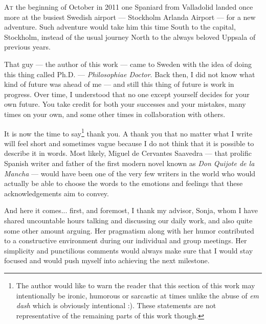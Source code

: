 

\lettrine{\textcolor[gray]{.25}{A}}{t} the beginning of October in 2011 one Spaniard 
from Valladolid landed once more at the busiest Swedish airport --- Stockholm Arlanda 
Airport --- for a new adventure. Such adventure would take him this time South to 
the capital, Stockholm, instead of the usual journey North to the always beloved 
Uppsala of previous years.

That guy --- the author of this work --- came to Sweden with the idea of doing this 
thing called Ph.D. --- \emph{Philosophiae Doctor}. Back then, I did not know what 
kind of future was ahead of me --- and still this thing of future is work in progress. 
Over time, I understood that no one except yourself decides for your own future. 
You take credit for both your successes and your mistakes, many times on your own, 
and some other times in collaboration with others.

It is now the time to say\footnote{The author would like to warn the reader that 
this section of this work may intentionally be ironic, humorous or sarcastic at 
times unlike the abuse of \emph{em dash} which is obviously intentional :). These 
statements are not representative of the remaining parts of this work though.} thank 
you. A thank you that no matter what I write will feel short and sometimes vague 
because I do not think that it is possible to describe it in words. Most likely, 
Miguel de Cervantes Saavedra --- that prolific Spanish writer and father of the 
first modern novel known as \emph{Don Quijote de la Mancha} --- would have been 
one of the very few writers in the world who would actually be able to choose the 
words to the emotions and feelings that these acknowledgements aim to convey.

And here it comes... first, and foremost, I thank my advisor, Sonja, whom I have 
shared uncountable hours talking and discussing our daily work, and also quite some 
other amount arguing. Her pragmatism along with her humor contributed to a constructive 
environment during our individual and group meetings. Her simplicity and punctilious 
comments would always make sure that I would stay focused and would push myself 
into achieving the next milestone. 


